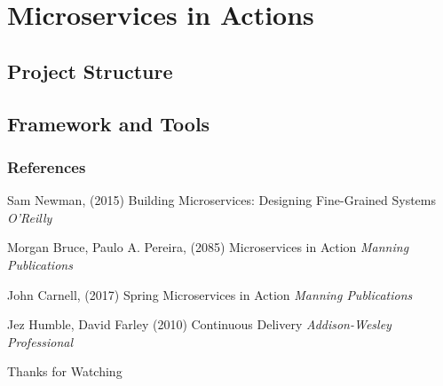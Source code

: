 \documentclass{beamer}
\begin{document}
		


\section{Microservices in Actions}
	\subsection {Project Structure}
	\subsection {Framework and Tools}
	
	
\begin{frame}
\frametitle{References}
\footnotesize{
\begin{thebibliography}{99} %
 Sam Newman, (2015)
\newblock Building Microservices: Designing Fine-Grained Systems
\newblock \emph{O'Reilly}

 Morgan Bruce, Paulo A. Pereira, (2085)
\newblock Microservices in Action
\newblock \emph{Manning Publications}

 John Carnell, (2017)
\newblock Spring Microservices in Action
\newblock \emph{Manning Publications}

 Jez Humble, David Farley (2010)
\newblock Continuous Delivery
\newblock \emph{Addison-Wesley Professional}
\end{thebibliography}
}
\end{frame}


\begin{frame}
\Huge{\centerline{Thanks for Watching}}
\end{frame}

\end{document}
